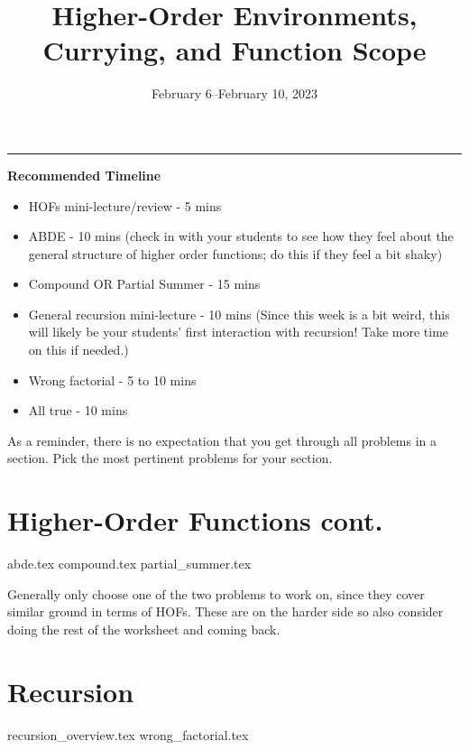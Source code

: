 \documentclass{exam}
\title{Higher-Order Environments, Currying, and Function Scope}
\date{February 6--February 10, 2023}
\begin{document}
\maketitle
\rule{\textwidth}{0.15em}
\fontsize{12}{15}\selectfont

\begin{meta}
\textbf{Recommended Timeline}
\begin{itemize}
    \item HOFs mini-lecture/review - 5 mins
    \item ABDE - 10 mins (check in with your students to see how they feel about the general structure of higher order functions; do this if they feel a bit shaky)
    \item Compound OR Partial Summer - 15 mins
    \item General recursion mini-lecture - 10 mins (Since this week is a bit weird, this will likely be your students' first interaction with recursion! Take more time on this if needed.)
    \item Wrong factorial - 5 to 10 mins
    \item All true - 10 mins
\end{itemize}
As a reminder, there is no expectation that you get through all problems in a section. Pick the most pertinent problems for your section. 
\end{meta}

\begin{questions}
    \section{Higher-Order Functions cont.}
    {abde.tex}
    {compound.tex}
    {partial_summer.tex}
    \begin{questionmeta}
        Generally only choose one of the two problems to work on, since they cover similar ground in terms of HOFs. These are on the harder side so also consider doing the rest of the worksheet and coming back.
    \end{questionmeta}

    \section{Recursion}
    {recursion_overview.tex}
    {wrong_factorial.tex}
\end{questions}
\end{document}
